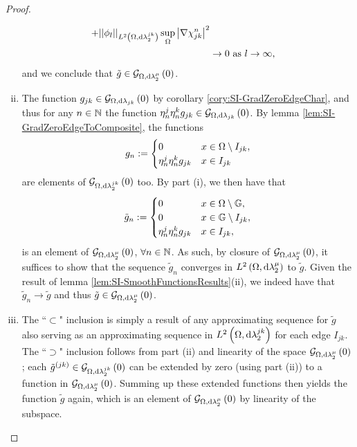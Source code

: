 \begin{proof}
\begin{enumerate}[(i)]
\begin{align*}
			+ \lvert\lvert \phi_l \rvert\rvert_{L^{2}\left( \Omega,\mathrm{d} \lambda_2^{jk} \right)} \sup_{\Omega}\left\lvert \nabla\chi_{jk}^n \right\rvert^2 \\
			&\rightarrow 0 \ \text{as} \ l \rightarrow\infty,
		\end{align*}
		and we conclude that $\tilde{g}\in\mathcal{G}_{ \Omega, \mathrm{d}\lambda_2^{\mu}}\left( 0 \right)$.
		\item The function $g_{jk}\in\mathcal{G}_{ \Omega, \mathrm{d}\lambda_{jk}}\left( 0 \right)$ by corollary \ref{cory:SI-GradZeroEdgeChar}, and thus for any $n\in\mathbb{N}$ the function $\eta_n^j\eta_n^k g_{jk}\in\mathcal{G}_{ \Omega, \mathrm{d}\lambda_{jk}}\left( 0 \right)$.
		By lemma \ref{lem:SI-GradZeroEdgeToComposite}, the functions
		\begin{align*}
			g_n := \begin{cases} 0 & x\in\Omega\setminus I_{jk}, \\ \eta_n^j\eta_n^k g_{jk} & x\in I_{jk} \end{cases}
		\end{align*}
		are elements of $\mathcal{G}_{ \Omega, \mathrm{d}\lambda_2^{jk}}\left( 0 \right)$ too.
		By part (i), we then have that
		\begin{align*}
			\tilde{g}_n := 	\begin{cases} 0 & x\in\Omega\setminus\mathbb{G}, \\ 0 & x\in\mathbb{G}\setminus I_{jk}, \\ \eta_n^j\eta_n^k g_{jk} & x\in I_{jk}, \end{cases}
		\end{align*}
		is an element of $\mathcal{G}_{ \Omega, \mathrm{d}\lambda_2^{\mu}}\left( 0 \right)$, $\forall n\in\mathbb{N}$.
		As such, by closure of $\mathcal{G}_{ \Omega, \mathrm{d}\lambda_2^{\mu}}\left( 0 \right)$, it suffices to show that the sequence $\tilde{g}_n$ converges in $L^{2}\left( \Omega,\mathrm{d} \lambda_2^{\mu} \right)$ to $\tilde{g}$.
		Given the result of lemma \ref{lem:SI-SmoothFunctionsResults}(ii), we indeed have that $\tilde{g}_n\rightarrow\tilde{g}$ and thus $\tilde{g}\in\mathcal{G}_{ \Omega, \mathrm{d}\lambda_2^{\mu}}\left( 0 \right)$.
		\item The ``$\subset$" inclusion is simply a result of any approximating sequence for $\tilde{g}$ also serving as an approximating sequence in $L^{2}\left( \Omega,\mathrm{d} \lambda_2^{jk} \right)$ for each edge $I_{jk}$. \newline
		The ``$\supset$" inclusion follows from part (ii) and linearity of the space $\mathcal{G}_{ \Omega, \mathrm{d}\lambda_2^{\mu}}\left( 0 \right)$; each $\tilde{g}^{(jk)}\in\mathcal{G}_{ \Omega, \mathrm{d}\lambda_2^{jk}}\left( 0 \right)$ can be extended by zero (using part (ii)) to a function in $\mathcal{G}_{ \Omega, \mathrm{d}\lambda_2^{\mu}}\left( 0 \right)$.
		Summing up these extended functions then yields the function $\tilde{g}$ again, which is an element of $\mathcal{G}_{ \Omega, \mathrm{d}\lambda_2^{\mu}}\left( 0 \right)$ by linearity of the subspace.
	\end{enumerate}
\end{proof}

